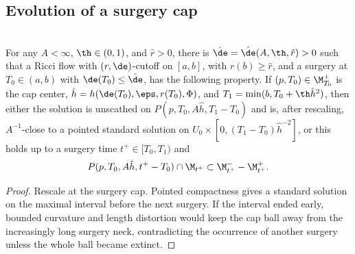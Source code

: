 \subsection{Evolution of a surgery cap}
\label{secII.4.5}

\begin{lemma}
  \label{lem:kl-evolution-surgery-cap-existence-standard-solutions}
\label{II.4.5}\\
For any $A<\infty$, $\th\in(0,1)$, and $\hat r>0$, there is
$\hat\de=\hat\de(A,\th,\hat r)>0$ such that a Ricci flow with
$(r,\de)$-cutoff on $[a,b]$, with $r(b)\geq\hat r$, and a surgery at
$T_0\in(a,b)$ with $\de(T_0)\leq\hat\de$, has the following property.
If $(p,T_0)\in\M_{T_0}^+$ is the cap center,
$\hat h=h(\de(T_0),\eps,r(T_0),\Phi)$, and
$T_1=\min(b,T_0+\th\hat h^2)$, then either the solution is unscathed on
$P(p,T_0,A\hat h,T_1-T_0)$ and is, after rescaling, $A^{-1}$-close to a
pointed standard solution on
$U_0\times[0,(T_1-T_0)\hat h^{-2}]$, or this holds up to a surgery time
$t^+\in[T_0,T_1)$ and
\[
P(p,T_0,A\hat h,t^+-T_0)\cap\M_{t^+}
\subset\M_{t^+}^--\M_{t^+}^+.
\]
\end{lemma}
\begin{proof}
\sketch Rescale at the surgery cap. Pointed compactness gives a standard
solution on the maximal interval before the next surgery. If the interval
ended early, bounded curvature and length distortion would keep the cap ball
away from the increasingly long surgery neck, contradicting the occurrence
of another surgery unless the whole ball became extinct.
\end{proof}

